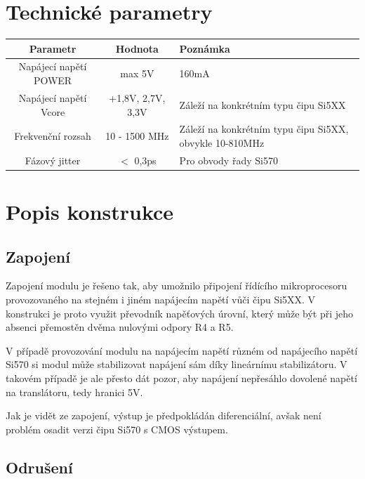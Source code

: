 \documentclass[12pt,a4paper,oneside]{article}
\begin{document}
\section{Technické parametry}
\begin{table}[htbp]
\begin{center}
\begin{tabular}{|c|c|p{4.7cm}|}
\hline
Parametr & Hodnota & Poznámka \\
\hline
Napájecí napětí POWER  & max 5V &  160mA \\ 
\hline
Napájecí napětí Vcore & +1,8V, 2,7V, 3,3V &  Záleží na konkrétním typu čipu Si5XX \\ 
\hline
Frekvenční rozsah  & 10 - 1500 MHz & Záleží na konkrétním typu čipu Si5XX, obvykle 10-810MHz \\ 
\hline
Fázový jitter  & $<$ 0,3ps & Pro obvody řady Si570 \\ 
\hline
\end{tabular}
\end{center}
\end{table}

\section{Popis konstrukce}

\subsection{Zapojení}
Zapojení modulu je řešeno tak, aby umožnilo připojení řídícího mikroprocesoru provozovaného na stejném i jiném napájecím napětí vůči čipu Si5XX. V konstrukci je proto využit převodník napěťových úrovní, který může být při jeho absenci přemostěn dvěma nulovými odpory R4 a R5.

V případě provozování modulu na napájecím napětí různém od napájecího napětí Si570 si modul může stabilizovat napájení sám díky lineárnímu stabilizátoru. V takovém případě je ale přesto dát pozor, aby napájení nepřesáhlo dovolené napětí na translátoru, tedy hranici 5V. 



Jak je vidět ze zapojení, výstup je předpokládán diferenciální, avšak není problém osadit verzi čipu Si570 s CMOS výstupem. 

\subsection{Odrušení}
\end{document}
